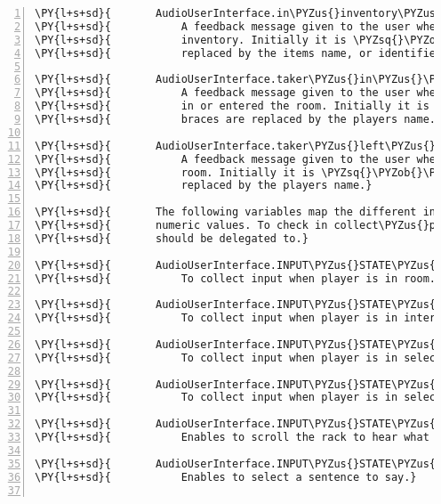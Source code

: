 \begin{Verbatim}[commandchars=\\\{\},numbers=left,firstnumber=1,stepnumber=1]
\PY{l+s+sd}{       AudioUserInterface.in\PYZus{}inventory\PYZus{}msg}
\PY{l+s+sd}{           A feedback message given to the user when an item is added to the}
\PY{l+s+sd}{           inventory. Initially it is \PYZsq{}\PYZob{}\PYZcb{} in inventory\PYZsq{} where the braces are}
\PY{l+s+sd}{           replaced by the items name, or identifier if it does not provide one.}

\PY{l+s+sd}{       AudioUserInterface.taker\PYZus{}in\PYZus{}\PYZus{}room\PYZus{}msg}
\PY{l+s+sd}{           A feedback message given to the user when another player already is}
\PY{l+s+sd}{           in or entered the room. Initially it is \PYZsq{}\PYZob{}\PYZcb{} is in the room\PYZsq{} where the}
\PY{l+s+sd}{           braces are replaced by the players name.}

\PY{l+s+sd}{       AudioUserInterface.taker\PYZus{}left\PYZus{}room\PYZus{}msg}
\PY{l+s+sd}{           A feedback message given to the user when another player left the}
\PY{l+s+sd}{           room. Initially it is \PYZsq{}\PYZob{}\PYZcb{} left the room\PYZsq{} where the braces are}
\PY{l+s+sd}{           replaced by the players name.}

\PY{l+s+sd}{       The following variables map the different input states of the client to}
\PY{l+s+sd}{       numeric values. To check in collect\PYZus{}player\PYZus{}input which menu the input}
\PY{l+s+sd}{       should be delegated to.}

\PY{l+s+sd}{       AudioUserInterface.INPUT\PYZus{}STATE\PYZus{}IN\PYZus{}ROOM}
\PY{l+s+sd}{           To collect input when player is in room.}

\PY{l+s+sd}{       AudioUserInterface.INPUT\PYZus{}STATE\PYZus{}INTERACTION}
\PY{l+s+sd}{           To collect input when player is in interaction menu.}

\PY{l+s+sd}{       AudioUserInterface.INPUT\PYZus{}STATE\PYZus{}SELECT\PYZus{}TARGET}
\PY{l+s+sd}{           To collect input when player is in select target menu.}

\PY{l+s+sd}{       AudioUserInterface.INPUT\PYZus{}STATE\PYZus{}SELECT\PYZus{}ITEM}
\PY{l+s+sd}{           To collect input when player is in select item menu.}

\PY{l+s+sd}{       AudioUserInterface.INPUT\PYZus{}STATE\PYZus{}SEE\PYZus{}RACK}
\PY{l+s+sd}{           Enables to scroll the rack to hear what it contains.}

\PY{l+s+sd}{       AudioUserInterface.INPUT\PYZus{}STATE\PYZus{}CAN\PYZus{}SPEEK}
\PY{l+s+sd}{           Enables to select a sentence to say.}


\end{Verbatim}
